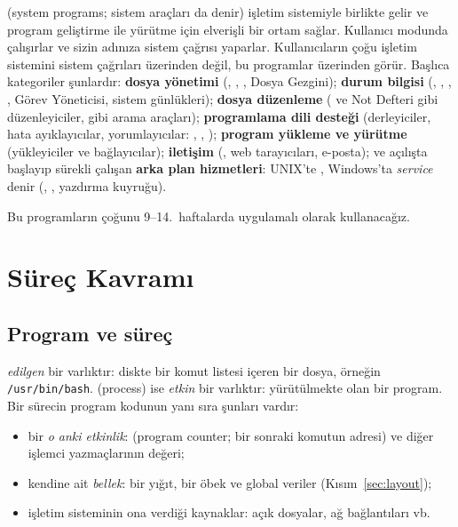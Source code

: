  (system programs; sistem araçları da denir) işletim sistemiyle birlikte gelir ve program geliştirme ile yürütme için elverişli bir ortam sağlar. Kullanıcı modunda çalışırlar ve sizin adınıza sistem çağrısı yaparlar. Kullanıcıların çoğu işletim sistemini sistem çağrıları üzerinden değil, bu programlar üzerinden görür. Başlıca kategoriler şunlardır: \textbf{dosya yönetimi} (, , , Dosya Gezgini); \textbf{durum bilgisi} (, , , , Görev Yöneticisi, sistem günlükleri); \textbf{dosya düzenleme} ( ve Not Defteri gibi düzenleyiciler,  gibi arama araçları); \textbf{programlama dili desteği} (derleyiciler, hata ayıklayıcılar, yorumlayıcılar: , , ); \textbf{program yükleme ve yürütme} (yükleyiciler ve bağlayıcılar); \textbf{iletişim} (, web tarayıcıları, e-posta); ve açılışta başlayıp sürekli çalışan \textbf{arka plan hizmetleri}: UNIX'te , Windows'ta \emph{service} denir (, , yazdırma kuyruğu).

Bu programların çoğunu 9--14.~haftalarda uygulamalı olarak kullanacağız.

\section{Süreç Kavramı}
\label{sec:process}

\subsection{Program ve süreç}

 \emph{edilgen} bir varlıktır: diskte bir komut listesi içeren bir dosya, örneğin \texttt{/usr/bin/bash}.  (process) ise \emph{etkin} bir varlıktır: yürütülmekte olan bir program. Bir sürecin program kodunun yanı sıra şunları vardır:
\begin{itemize}
  \item bir \emph{o anki etkinlik}:  (program counter; bir sonraki komutun adresi) ve diğer işlemci yazmaçlarının değeri;
  \item kendine ait \emph{bellek}: bir yığıt, bir öbek ve global veriler (Kısım~\ref{sec:layout});
  \item işletim sisteminin ona verdiği kaynaklar: açık dosyalar, ağ bağlantıları vb.
\end{itemize}

